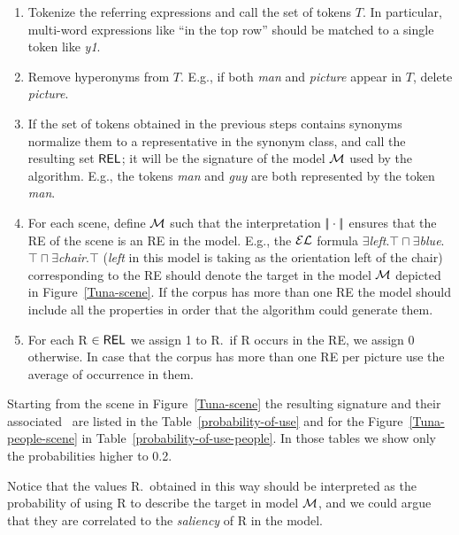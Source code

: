 \begin{enumerate}
\item Tokenize the referring expressions and call the set of tokens $T$. In particular, multi-word expressions like ``in the top row'' 
should be matched to a single token like \emph{y1}.

\item Remove hyperonyms from $T$. E.g., if both \emph{man} and \emph{picture} appear in $T$, delete \emph{picture}.

\item If the set of tokens obtained in the previous steps contains synonyms normalize them to a representative in the synonym class, 
and call the resulting set $\textsf{REL}$; it will be the signature of the model $\mathcal{M}$ used by the algorithm. E.g., the tokens \emph{man} 
and \emph{guy} are both represented by the token \emph{man}.

\item For each scene, define $\mathcal{M}$ such that the interpretation $|\!|\cdot|\!|$ ensures that the RE of the scene is an RE in the model.
 E.g., the $\mathcal{EL}$ formula $\exists$\emph{left}.$\top \sqcap \exists$\emph{blue}.$\top \sqcap \exists$\emph{chair}.$\top$ (\emph{left} in this model is taking as the orientation left of the chair) corresponding to the RE should denote the target in the model $\mathcal{M}$ depicted in Figure~\ref{Tuna-scene}. If the corpus has more than one RE the model should include all the properties in order that the algorithm could generate them.\\

\item For each R $\in \textsf{REL}$ we assign 1 to R.\puse\ if R occurs in the RE, we assign 0 otherwise. In case that the corpus has more than one RE per picture use the average of occurrence in them.

\end{enumerate}

Starting from the scene in Figure~\ref{Tuna-scene}
the resulting signature and their associated \puse\ are listed in the Table~\ref{probability-of-use} and for the Figure~\ref{Tuna-people-scene} in Table~\ref{probability-of-use-people}. In those tables we show only the probabilities higher to 0.2.

Notice that the values R.\puse\ obtained in this way should be interpreted as the probability of using R to describe the target in model 
$\mathcal{M}$, and we could argue that they are correlated to the \emph{saliency} of R in the model.  

